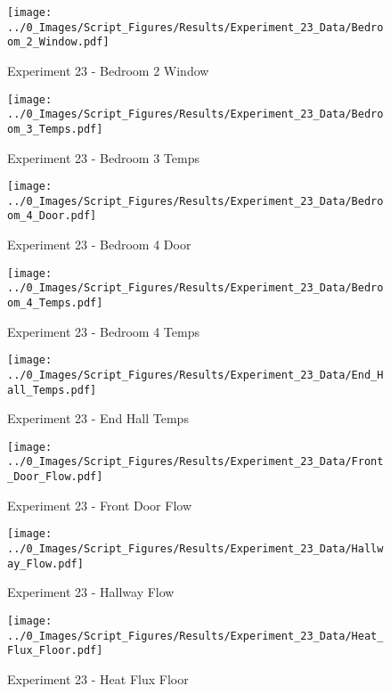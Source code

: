 	\clearpage

	\begin{figure}[H]
		\centering
		\texttt{[image: ../0\_Images/Script\_Figures/Results/Experiment\_23\_Data/Bedroom\_2\_Window.pdf]}
		\caption[]{Experiment 23 - Bedroom 2 Window}
	\end{figure}
 

	\begin{figure}[H]
		\centering
		\texttt{[image: ../0\_Images/Script\_Figures/Results/Experiment\_23\_Data/Bedroom\_3\_Temps.pdf]}
		\caption[]{Experiment 23 - Bedroom 3 Temps}
	\end{figure}
 
	\clearpage

	\begin{figure}[H]
		\centering
		\texttt{[image: ../0\_Images/Script\_Figures/Results/Experiment\_23\_Data/Bedroom\_4\_Door.pdf]}
		\caption[]{Experiment 23 - Bedroom 4 Door}
	\end{figure}
 

	\begin{figure}[H]
		\centering
		\texttt{[image: ../0\_Images/Script\_Figures/Results/Experiment\_23\_Data/Bedroom\_4\_Temps.pdf]}
		\caption[]{Experiment 23 - Bedroom 4 Temps}
	\end{figure}
 
	\clearpage

	\begin{figure}[H]
		\centering
		\texttt{[image: ../0\_Images/Script\_Figures/Results/Experiment\_23\_Data/End\_Hall\_Temps.pdf]}
		\caption[]{Experiment 23 - End Hall Temps}
	\end{figure}
 

	\begin{figure}[H]
		\centering
		\texttt{[image: ../0\_Images/Script\_Figures/Results/Experiment\_23\_Data/Front\_Door\_Flow.pdf]}
		\caption[]{Experiment 23 - Front Door Flow}
	\end{figure}
 
	\clearpage

	\begin{figure}[H]
		\centering
		\texttt{[image: ../0\_Images/Script\_Figures/Results/Experiment\_23\_Data/Hallway\_Flow.pdf]}
		\caption[]{Experiment 23 - Hallway Flow}
	\end{figure}
 

	\begin{figure}[H]
		\centering
		\texttt{[image: ../0\_Images/Script\_Figures/Results/Experiment\_23\_Data/Heat\_Flux\_Floor.pdf]}
		\caption[]{Experiment 23 - Heat Flux Floor}
	\end{figure}
 
